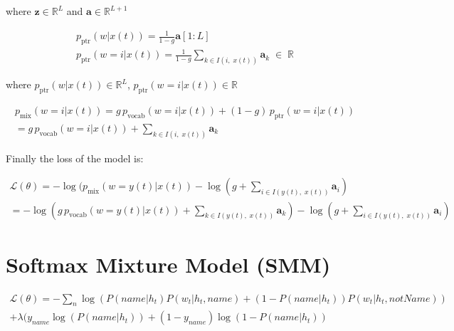 where $\mathbf{z} \in \mathbb{R}^{L}$ and $\mathbf{a} \in \mathbb{R}^{L+1}$

\begin{equation}
	\begin{gathered}
		p_{\text{ptr}}(w|x(t)) = \frac{1}{1-g}\mathbf{a}[1:L] \\
		p_{\text{ptr}}(w=i|x(t)) = \frac{1}{1-g}\sum_{k \in I(i, \; x(t))}\mathbf{a}_k \; \in \; \mathbb{R}
	\end{gathered}
\end{equation}

where $p_{\text{ptr}}(w|x(t)) \in \mathbb{R}^{L}$, $p_{\text{ptr}}(w=i|x(t)) \in \mathbb{R}$

\begin{equation}
	\begin{gathered}
		p_{\text{mix}}(w=i|x(t)) = g \, p_{\text{vocab}}(w=i|x(t)) + (1-g) \, p_{\text{ptr}}(w=i|x(t)) \\
		= g \, p_{\text{vocab}}(w=i|x(t)) + \sum_{k \in I(i, \; x(t))}\mathbf{a}_k
	\end{gathered}
\end{equation}

Finally the loss of the model is:

\begin{equation}
	\begin{gathered}
		\mathcal{L}(\theta) = -\log(p_{\text{mix}}(w=y(t)|x(t)) -\log(g + \sum_{i \in I(y(t), \; x(t))}\mathbf{a}_i) \\
		= -\log(g \, p_{\text{vocab}}(w=y(t)|x(t)) + \sum_{k \in I(y(t), \; x(t))}\mathbf{a}_k) -\log(g + \sum_{i \in I(y(t), \; x(t))}\mathbf{a}_i)
	\end{gathered}
\end{equation}

\section{Softmax Mixture Model (SMM)}
\label{sec:mixtureModel}

\begin{equation}
	\begin{gathered}
		\mathcal{L}(\theta) = -\sum_{n} \log(P(name|h_t)P(w_t|h_t, name) + (1-P(name|h_t))P(w_t|h_t, notName)) \\
		+ \lambda(y_{name}\log(P(name|h_t)) + (1 - y_{name})\log(1-P(name|h_t)) \\
	\end{gathered}
\end{equation}


